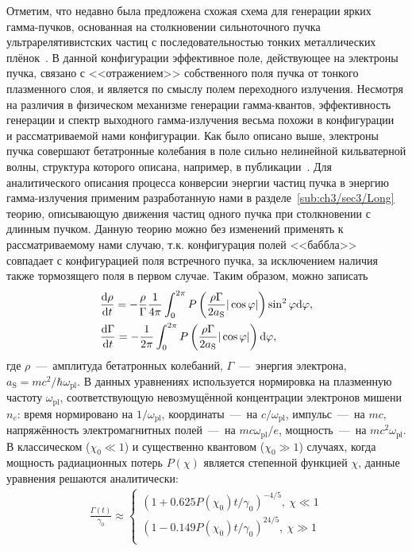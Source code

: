Отметим, что недавно была предложена схожая схема для генерации ярких гамма-пучков, основанная на столкновении сильноточного пучка ультрарелятивистских частиц с последовательностью тонких металлических плёнок~\cite{sampath2021extremely}. 
В данной конфигурации эффективное поле, действующее на электроны пучка, связано с <<отражением>> собственного поля пучка от тонкого плазменного слоя, и является по смыслу полем переходного излучения.
Несмотря на различия в физическом механизме генерации гамма-квантов, эффективность генерации и спектр выходного гамма-излучения весьма похожи в конфигурации~\cite{sampath2021extremely} и рассматриваемой нами конфигурации.
Как было описано выше, электроны пучка совершают бетатронные колебания в поле сильно нелинейной кильватерной волны, структура которого описана, например, в публикации~\cite{kostyukov2004phenomenological}.
Для аналитического описания процесса конверсии энергии частиц пучка в энергию гамма-излучения применим разработанную нами в разделе~\ref{sub:ch3/sec3/Long} теорию, описывающую движения частиц одного пучка при столкновении с длинным пучком.
Данную теорию можно без изменений применять к рассматриваемому нами случаю, т.к. конфигурация полей <<баббла>> совпадает с конфигурацией поля встречного пучка, за исключением наличия также тормозящего поля в первом случае.
Таким образом, можно записать
\begin{align}
    \label{eq:ch3/sec3/dydt}
    &\dv{\rho}{t} = -\frac{\rho}{\Gamma}\frac{1}{4\pi}\int_0^{2\pi}P\left(\frac{\rho\Gamma }{2a_\mathrm{S}} | \cos\varphi |\right)\sin^2\varphi \dd\varphi ,\\
    \label{eq:ch3/sec3/dgdt}
    &\dv{\Gamma}{t} = -\frac{1}{2\pi}\int_0^{2\pi}P\left(\frac{\rho \Gamma }{2a_\mathrm{S}} | \cos\varphi |\right) \dd\varphi,
\end{align}
где $\rho$~---~амплитуда бетатронных колебаний, $\Gamma$~---~энергия электрона, $a_\mathrm{S} = mc^2/\hbar\omega_\mathrm{pl}$.
В данных уравнениях используется нормировка на плазменную частоту $\omega_\mathrm{pl}$, соответствующую невозмущённой концентрации электронов мишени $n_e$: время нормировано на $ 1/\omega_\mathrm{pl}$, координаты~---~на $c/\omega_\mathrm{pl}$, импульс~---~на $mc$, напряжённость электромагнитных полей~---~на $mc\omega_\mathrm{pl}/e$, мощность~---~на $mc^2\omega_\mathrm{pl}$.
В классическом ($\chi_0 \ll 1$) и существенно квантовом ($\chi_0 \gg 1$) случаях, когда мощность радиационных потерь $P(\chi)$ является степенной функцией $\chi$, данные уравнения решаются аналитически:
\begin{align}
    \label{eq:ch3/sec3/gamma}
    \frac{ \Gamma(t) }{\gamma_0} \approx 
    \begin{cases}
        {\left(1 + 0.625 P(\chi_0) t / \gamma_0 \right)}^{-4/5},\ \chi\ll 1 \\
        {\left(1 - 0.149 P(\chi_0) t / \gamma_0 \right)}^{24/5},\ \chi\gg 1 \\
    \end{cases}
\end{align}
